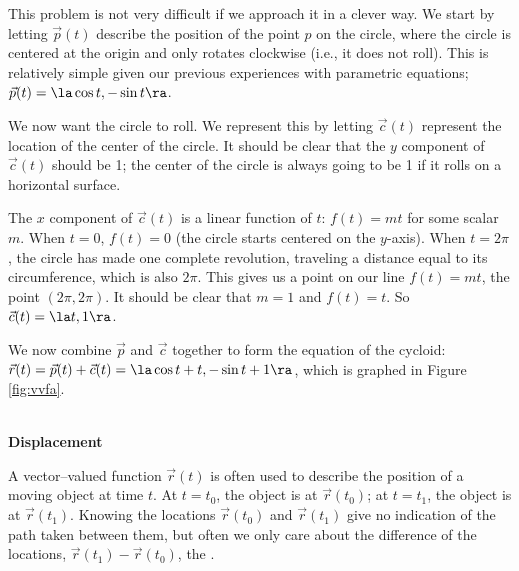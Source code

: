 {This problem is not very difficult if we approach it in a clever way. We start by letting $\vec p(t)$ describe the position of the point $p$ on the circle, where the circle is centered at the origin and only rotates clockwise (i.e., it  does not roll). This is relatively simple given our previous experiences with parametric equations; $\vec p(t) = \la \cos t, -\sin t\ra$. 

We now want the circle to roll. We represent this by letting $\vec c(t)$ represent the location of the center of the circle. It should be clear that the $y$ component of $\vec c(t)$ should be 1; the center of the circle is always going to be 1 if it rolls on a horizontal surface.

The $x$ component of $\vec c(t)$ is a linear function of $t$: $f(t) = mt$ for some scalar $m$. When $t=0$, $f(t) = 0$ (the circle starts centered on the $y$-axis). When $t=2\pi$, the circle has made one complete revolution, traveling a distance equal to its circumference, which is also $2\pi$. This gives us a point on our line $f(t) = mt$, the point $(2\pi, 2\pi)$. It should be clear that $m=1$ and $f(t) = t$. So $\vec c(t) = \la t, 1\ra$. 

We now combine $\vec p$ and $\vec c$ together to form the equation of the cycloid: $\vec r(t) = \vec p(t) + \vec c(t) = \la \cos t+ t,-\sin t+1\ra$, which is graphed in Figure \ref{fig:vvfa}. 
}\\ 

\noindent\textbf{\large Displacement}\\

\addtocounter{figure}{1}

A vector--valued function $\vec r(t)$ is often used to describe the position of a moving object at time $t$. At $t=t_0$, the object is at $\vec r(t_0)$; at $t=t_1$, the object is at $\vec r(t_1)$. Knowing the locations $\vec r(t_0)$ and $\vec r(t_1)$ give no indication of the path taken between them, but often we only care about the difference of the locations, $\vec r(t_1)-\vec r(t_0)$, the .

